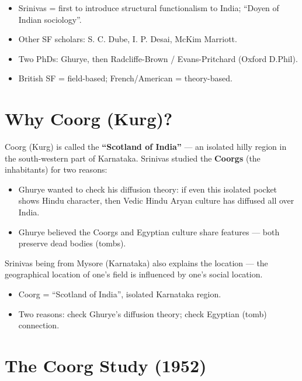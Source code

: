 \begin{QuickRevision}
\begin{itemize}
\item Srinivas = first to introduce structural functionalism to India; ``Doyen of Indian sociology''.
\item Other SF scholars: S. C. Dube, I. P. Desai, McKim Marriott.
\item Two PhDs: Ghurye, then Radcliffe-Brown / Evans-Pritchard (Oxford D.Phil).
\item British SF = field-based; French/American = theory-based.
\end{itemize}
\end{QuickRevision}

\section{Why Coorg (Kurg)?}

Coorg (Kurg) is called the \textbf{``Scotland of India''} --- an isolated hilly region in the south-western part of Karnataka. Srinivas studied the \textbf{Coorgs} (the inhabitants) for two reasons:
\begin{itemize}
\item Ghurye wanted to check his diffusion theory: if even this isolated pocket shows Hindu character, then Vedic Hindu Aryan culture has diffused all over India.
\item Ghurye believed the Coorgs and Egyptian culture share features --- both preserve dead bodies (tombs).
\end{itemize}

\begin{ExampleBox}
Srinivas being from Mysore (Karnataka) also explains the location --- the geographical location of one's field is influenced by one's social location.
\end{ExampleBox}

\begin{QuickRevision}
\begin{itemize}
\item Coorg = ``Scotland of India'', isolated Karnataka region.
\item Two reasons: check Ghurye's diffusion theory; check Egyptian (tomb) connection.
\end{itemize}
\end{QuickRevision}

\section{The Coorg Study (1952)}

